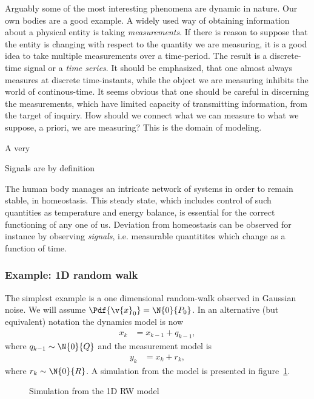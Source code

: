 Arguably some of the most interesting phenomena are dynamic in nature. 
Our own bodies are a good example. A widely used way of obtaining information
about a physical entity is taking \emph{measurements}. If there is reason
to suppose that the entity is changing with respect to the quantity
we are measuring, it is a good idea to take multiple measurements over
a time-period. The result is a discrete-time signal or a \emph{time series}.
It should be emphasized, that one almost always measures at discrete time-instants,
while the object we are measuring inhibits the world of continous-time.
It seems obvious that one should be careful in discerning the measurements,
which have limited capacity of transmitting information, from the target of inquiry.
How should we connect what we can measure to what we suppose, a priori, we are
measuring? This is the domain of modeling.

A very 


Signals are by definition 

The human body manages an intricate network of systems in order to remain
stable, in homeostasis. This steady state, which includes control of such quantities
as temperature and energy balance, is essential for the correct functioning of any one of us.
Deviation from homeostasis can be observed for instance by observing
\emph{signals}, i.e. measurable quantitites which change as a function of time.
 


\parencite{Murphy2002}
\subsubsection*{Example: 1D random walk}
The simplest example is a one dimensional random-walk observed in Gaussian noise.
We will assume $\Pdf{\v{x}_0}=\N{0}{P_0}$. In an alternative (but equivalent) notation
the dynamics model is now
\begin{align}
	x_k&=x_{k-1}+q_{k-1},
\end{align}
where $q_{k-1}\sim \N{0}{Q}$ and the measurement model is
\begin{align}
	y_k&=x_{k}+r_{k},
\end{align}
where $r_{k}\sim \N{0}{R}$. A simulation from the model is presented in figure~\ref{fig:rw1d}.

\begin{figure}[htp]
\begin{center}
  \caption{Simulation from the 1D RW model}
  \label{fig:rw1d}
\end{center}
\end{figure}
